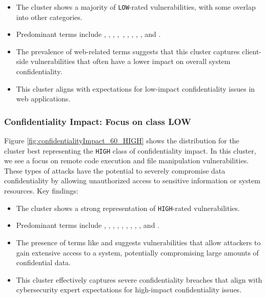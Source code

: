\documentclass[12pt]{article}
\begin{document}
\begin{itemize}

	\item The cluster shows a majority of \texttt{LOW}-rated vulnerabilities, with some overlap into
	      other categories.

	\item Predominant terms include , , , ,\
	      , , , , , and .

	\item The prevalence of web-related terms suggests that this cluster captures client-side
	      vulnerabilities that often have a lower impact on overall system confidentiality.

	\item This cluster aligns with expectations for low-impact confidentiality issues in web
	      applications.

\end{itemize}

\subsubsection{Confidentiality Impact: Focus on class LOW}

Figure \ref{fig:confidentialityImpact_60_HIGH} shows the distribution for the cluster best
representing the \texttt{HIGH} class of confidentiality impact. In this cluster, we see a focus
on remote code execution and file manipulation vulnerabilities. These types of attacks have the
potential to severely compromise data confidentiality by allowing unauthorized access to sensitive
information or system resources. Key findings:

\begin{itemize}

	\item The cluster shows a strong representation of \texttt{HIGH}-rated vulnerabilities.

	\item Predominant terms include , , ,
	      \say{remote}, \say{upload}, \say{code},
	      , , , and .

	\item The presence of terms like  and  suggests vulnerabilities that allow
	      attackers to gain extensive access to a system, potentially compromising large amounts of
	      confidential data.

	\item This cluster effectively captures severe confidentiality breaches that align with
	      cybersecurity expert expectations for high-impact confidentiality issues.

\end{itemize}
\end{document}
